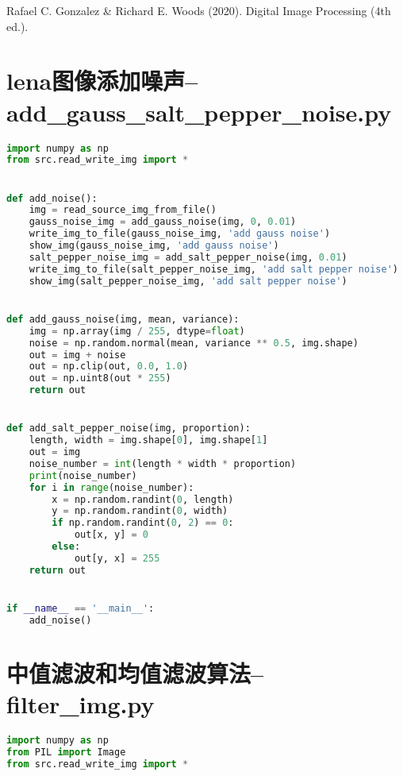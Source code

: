\documentclass{hitreport}
\begin{document}
\renewcommand\refname{参考文献}
 
\begin{thebibliography}{1}
Rafael C. Gonzalez \& Richard E. Woods (2020). Digital Image Processing (4th ed.).

\end{thebibliography}

\newpage
\begin{appendices}\label{sec:app}

\section{lena图像添加噪声--add\_gauss\_salt\_pepper\_noise.py}\label{app:niose}
\begin{lstlisting}[language=python]
import numpy as np
from src.read_write_img import *


def add_noise():
    img = read_source_img_from_file()
    gauss_noise_img = add_gauss_noise(img, 0, 0.01)
    write_img_to_file(gauss_noise_img, 'add gauss noise')
    show_img(gauss_noise_img, 'add gauss noise')
    salt_pepper_noise_img = add_salt_pepper_noise(img, 0.01)
    write_img_to_file(salt_pepper_noise_img, 'add salt pepper noise')
    show_img(salt_pepper_noise_img, 'add salt pepper noise')


def add_gauss_noise(img, mean, variance):
    img = np.array(img / 255, dtype=float)
    noise = np.random.normal(mean, variance ** 0.5, img.shape)
    out = img + noise
    out = np.clip(out, 0.0, 1.0)
    out = np.uint8(out * 255)
    return out


def add_salt_pepper_noise(img, proportion):
    length, width = img.shape[0], img.shape[1]
    out = img
    noise_number = int(length * width * proportion)
    print(noise_number)
    for i in range(noise_number):
        x = np.random.randint(0, length)
        y = np.random.randint(0, width)
        if np.random.randint(0, 2) == 0:
            out[x, y] = 0
        else:
            out[y, x] = 255
    return out


if __name__ == '__main__':
    add_noise()

\end{lstlisting}

\section{中值滤波和均值滤波算法--filter\_img.py}
\begin{lstlisting}[language=python]
import numpy as np
from PIL import Image
from src.read_write_img import *



\end{lstlisting}
\end{appendices}
\end{document}
